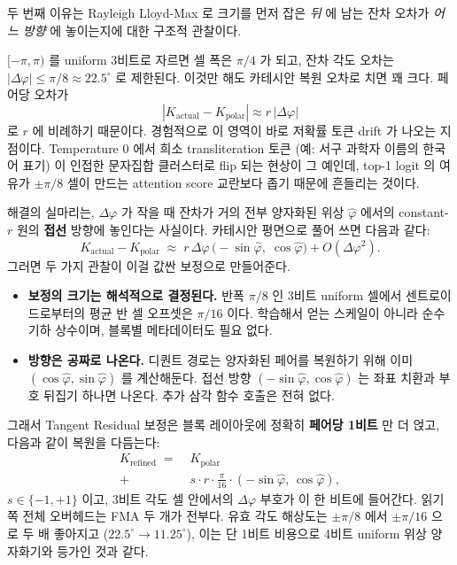 \documentclass[10pt,twocolumn]{article}
\begin{document}
두 번째 이유는 Rayleigh Lloyd-Max 로 크기를 먼저 잡은 \emph{뒤} 에 남는 잔차 오차가 \emph{어느 방향} 에 놓이는지에 대한 구조적 관찰이다.

$[-\pi,\pi)$ 를 uniform 3비트로 자르면 셀 폭은 $\pi/4$ 가 되고, 잔차 각도 오차는 $|\Delta\varphi| \le \pi/8 \approx 22.5^\circ$ 로 제한된다. 이것만 해도 카테시안 복원 오차로 치면 꽤 크다. 페어당 오차가
\begin{equation}
|K_{\text{actual}} - K_{\text{polar}}| \approx r\,|\Delta\varphi|
\end{equation}
로 $r$ 에 비례하기 때문이다. 경험적으로 이 영역이 바로 저확률 토큰 drift 가 나오는 지점이다. Temperature $0$ 에서 희소 transliteration 토큰 (예: 서구 과학자 이름의 한국어 표기) 이 인접한 문자집합 클러스터로 flip 되는 현상이 그 예인데, top-1 logit 의 여유가 $\pm\pi/8$ 셀이 만드는 attention score 교란보다 좁기 때문에 흔들리는 것이다.

해결의 실마리는, $\Delta\varphi$ 가 작을 때 잔차가 거의 전부 양자화된 위상 $\hat\varphi$ 에서의 constant-$r$ 원의 \textbf{접선} 방향에 놓인다는 사실이다. 카테시안 평면으로 풀어 쓰면 다음과 같다:
\begin{equation}
K_{\text{actual}} - K_{\text{polar}} \;\approx\; r\,\Delta\varphi\,\bigl(-\!\sin\hat\varphi,\;\cos\hat\varphi\bigr) + O(\Delta\varphi^2).
\end{equation}
그러면 두 가지 관찰이 이걸 값싼 보정으로 만들어준다.

\begin{itemize}[leftmargin=*,topsep=1pt,itemsep=1pt]
\item \textbf{보정의 크기는 해석적으로 결정된다.} 반폭 $\pi/8$ 인 3비트 uniform 셀에서 센트로이드로부터의 평균 반 셀 오프셋은 $\pi/16$ 이다. 학습해서 얻는 스케일이 아니라 순수 기하 상수이며, 블록별 메타데이터도 필요 없다.
\item \textbf{방향은 공짜로 나온다.} 디퀀트 경로는 양자화된 페어를 복원하기 위해 이미 $(\cos\hat\varphi,\sin\hat\varphi)$ 를 계산해둔다. 접선 방향 $(-\sin\hat\varphi,\cos\hat\varphi)$ 는 좌표 치환과 부호 뒤집기 하나면 나온다. 추가 삼각 함수 호출은 전혀 없다.
\end{itemize}

그래서 Tangent Residual 보정은 블록 레이아웃에 정확히 \textbf{페어당 1비트} 만 더 얹고, 다음과 같이 복원을 다듬는다:
\begin{equation}
\label{eq:tangent-correction}
\begin{aligned}
K_{\text{refined}} \;=\;& K_{\text{polar}} \\
 +\;& s\cdot r\cdot\tfrac{\pi}{16}\cdot(-\!\sin\hat\varphi,\,\cos\hat\varphi),
\end{aligned}
\end{equation}
$s\in\{-1,+1\}$ 이고, 3비트 각도 셀 안에서의 $\Delta\varphi$ 부호가 이 한 비트에 들어간다. 읽기 쪽 전체 오버헤드는 FMA 두 개가 전부다. 유효 각도 해상도는 $\pm\pi/8$ 에서 $\pm\pi/16$ 으로 두 배 좋아지고 ($22.5^\circ\!\to\!11.25^\circ$), 이는 단 1비트 비용으로 4비트 uniform 위상 양자화기와 등가인 것과 같다.
\end{document}
